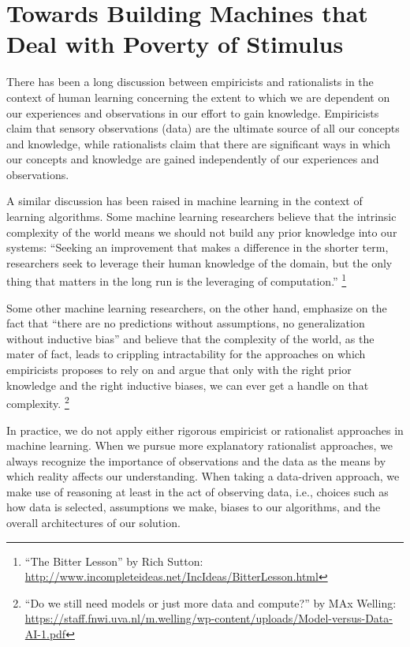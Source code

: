 \section{Towards Building Machines that Deal with Poverty of Stimulus}

There has been a long discussion between empiricists and rationalists in the context of human learning concerning the extent to which we are dependent on our experiences and observations in our effort to gain knowledge.  
%
Empiricists claim that sensory observations (data) are the ultimate source of all our concepts and knowledge, while rationalists claim that there are significant ways in which our concepts and knowledge are gained independently of our experiences and observations. 

A similar discussion has been raised in machine learning in the context of learning algorithms.
%
Some machine learning researchers believe that the intrinsic complexity of the world means we should not build any prior knowledge into our systems: ``Seeking an improvement that makes a difference in the shorter term, researchers seek to leverage their human knowledge of the domain, but the only thing that matters in the long run is the leveraging of computation.''%
\footnote{``The Bitter Lesson'' by Rich Sutton: \url{http://www.incompleteideas.net/IncIdeas/BitterLesson.html}}

Some other machine learning researchers, on the other hand, emphasize on the fact that ``there are no predictions without assumptions, no generalization without inductive bias'' and believe that the complexity of the world, as the mater of fact, leads to crippling intractability for the approaches on which empiricists proposes to rely on and argue that only with the right prior knowledge and the right inductive biases, we can ever get a handle on that complexity.
\footnote{``Do we still need models or just more data and compute?'' by MAx Welling: \url{https://staff.fnwi.uva.nl/m.welling/wp-content/uploads/Model-versus-Data-AI-1.pdf}}

In practice, we do not apply either rigorous empiricist or rationalist approaches in machine learning.  When we pursue more explanatory rationalist approaches, we always recognize the importance of observations and the data as the means by which reality affects our understanding.  When taking a data-driven approach, we make use of reasoning at least in the act of observing data, i.e., choices such as how data is selected, assumptions we make, biases to our algorithms, and the overall architectures of our solution. 

